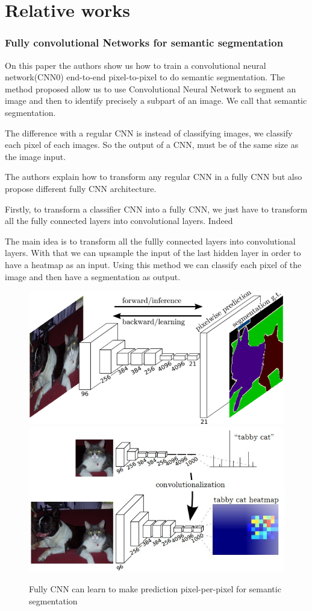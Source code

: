 \chapter{Relative works}

\subsection{Fully convolutional Networks for semantic segmentation \cite{Long_2015_CVPR}}
	On this paper \cite{Long_2015_CVPR} the authors show us how to train a convolutional neural network(CNN0) end-to-end pixel-to-pixel to do semantic segmentation. The method proposed allow us to use Convolutional Neural Network to segment an image and then to identify precisely a subpart of an image. We call that semantic segmentation.
    
    The difference with a regular CNN is instead of classifying images, we classify each pixel of each images. So the output of a CNN, must be of the same size as the image input.
    
    The authors explain how to transform any regular CNN in a fully CNN but also propose different fully CNN architecture.
    
    Firstly, to transform a classifier CNN into a fully CNN, we just have to transform all the fully connected layers into convolutional layers. Indeed 
    
    The main idea is to transform all the fullly connected layers into convolutional layers. With that we can upsample the input of the last hidden layer in order to have a heatmap as an input. Using this method we can classify each pixel of the image and then have a segmentation as output. 
    
    \begin{figure}
    	\includegraphics[width=0.49\linewidth]{images/fullCNN}
        \includegraphics[width=0.49\linewidth]{images/FCN_heatmap}
        
        \caption{Fully CNN can learn to make prediction pixel-per-pixel for semantic segmentation}
        \label{fullCNN}
    \end{figure}
    
